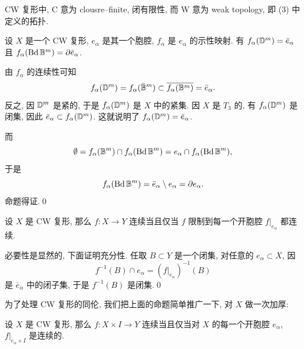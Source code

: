 CW 复形中, C 意为 clousre--finite, 闭有限性, 而 W 意为 weak topology, 即 (3) 中定义的拓扑.

\begin{Proposition}
	设 $ X $ 是一个 CW 复形, $ e_\alpha $ 是其一个胞腔, $ f_\alpha $ 是 $ e_\alpha $ 的示性映射. 有 $ f_\alpha(\mathbb{D}^m)=\bar{e}_\alpha $ 且 $ f_\alpha(\mathrm{Bd}\,\mathbb{B}^m)=\partial\bar{e}_\alpha $.
\end{Proposition}
\begin{Proof}
	由 $ f_\alpha $ 的连续性可知
	\[
		f_\alpha(\mathbb{D}^m)=f_\alpha(\bar{\mathbb{B}}^m)\subset\overline{f_\alpha(\mathbb{B}^m)}=\bar{e}_\alpha.
	\]
	反之, 因 $ \mathbb{D}^m $ 是紧的, 于是 $ f_\alpha(\mathbb{D}^m) $ 是 $ X $ 中的紧集. 因 $ X $ 是 $ T_3 $ 的, 有 $ f_\alpha(\mathbb{D}^m) $ 是闭集, 因此 $ \bar{e}_\alpha\subset f_\alpha(\mathbb{D}^m) $. 这就说明了 $ f_\alpha(\mathbb{D}^m)=\bar{e}_\alpha $.

	而
	\[
		\emptyset=f_\alpha(\mathbb{B}^m)\cap f_\alpha(\mathrm{Bd}\,\mathbb{B}^m)=e_\alpha\cap f_\alpha(\mathrm{Bd}\,\mathbb{B}^m),
	\]
	于是
	\[
		f_\alpha(\mathrm{Bd}\,\mathbb{B}^m)=\bar{e}_\alpha\setminus e_\alpha=\partial e_\alpha.
	\]
	命题得证.\qed
\end{Proof}

\begin{Proposition}
	设 $ X $ 是 CW 复形, 那么 $ f : X\to Y $ 连续当且仅当 $ f $ 限制到每一个开胞腔 $ f|_{e_\alpha} $ 都连续.
\end{Proposition}
\begin{Proof}
	必要性是显然的, 下面证明充分性. 任取 $ B\subset Y $ 是一个闭集, 对任意的 $ e_\alpha\subset X $, 因
	\[
		f^{-1}(B)\cap e_{\alpha}=(f|_{e_\alpha})^{-1}(B)
	\]
	是 $ \bar{e}_\alpha $ 中的闭子集, 于是 $ f^{-1}(B) $ 是闭集.\qed
\end{Proof}

为了处理 CW 复形的同伦, 我们把上面的命题简单推广一下, 对 $ X $ 做一次加厚:

\begin{Corollary}
	设 $ X $ 是 CW 复形, 那么 $ f : X\times I\to Y $ 连续当且仅当对 $ X $ 的每一个开胞腔 $ e_\alpha $, $ f|_{e_\alpha\times I} $ 是连续的.
\end{Corollary}

